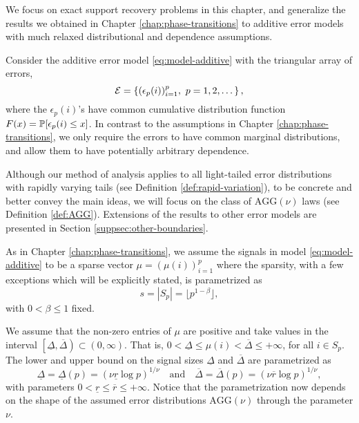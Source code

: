 
We focus on exact support recovery problems in this chapter, and generalize the results we obtained in Chapter \ref{chap:phase-transitions} to additive error models with much relaxed distributional and dependence assumptions.

Consider the additive error model \eqref{eq:model-additive} with the triangular array of errors,
\begin{equation} \label{eq:error-array}
    {\cal E} = \left\{ (\epsilon_p(i))_{i=1}^p,\ p=1,2,\dots\right\},
\end{equation}
where the $\epsilon_p(i)$'s have common cumulative distribution function $F(x)=\P[\epsilon_p(i)\le x]$.
In contrast to the assumptions in Chapter \ref{chap:phase-transitions}, we only require the errors to have common marginal distributions, and allow them to have potentially arbitrary dependence.

Although our method of analysis applies to all light-tailed error distributions with rapidly varying tails (see Definition \ref{def:rapid-variation}), to be concrete and better convey the main ideas, we will focus on the class of $\mathrm{AGG}(\nu)$ laws (see Definition \ref{def:AGG}).
Extensions of the results to other error models are presented in Section \ref{suppsec:other-boundaries}.

As in Chapter \ref{chap:phase-transitions}, we assume the signals in model \eqref{eq:model-additive} to be a sparse vector $\mu = \left(\mu(i)\right)_{i=1}^p$ where the sparsity, with a few exceptions which will be explicitly stated, is parametrized as
\begin{equation} \label{eq:sparsity-parametrized}
    s = |S_p| = \lfloor p^{1 -\beta} \rfloor, %
\end{equation}
with $0 < \beta \le 1$ fixed.

We assume that the non-zero entries of $\mu$ are positive and take values in the interval $\left[\underline{\Delta},\overline{\Delta}\right)\subset (0,\infty)$.
That is, $0<\underline{\Delta}\le\mu(i)<\overline{\Delta}\le+\infty$, for all $i\in S_p$.
The lower and upper bound on the signal sizes $\underline{\Delta}$ and $\overline{\Delta}$ are parametrized as
\begin{equation} \label{eq:signal-size-parametrized}
    \underline{\Delta} = \underline{\Delta}(p) = (\nu \underline{r} \log{p})^{1/\nu} \quad \text{and} \quad
    \overline{\Delta} = \overline{\Delta}(p)  = (\nu \overline{r} \log{p})^{1/\nu},
\end{equation}
with parameters $0 < \underline{r} \le \overline{r} \le +\infty$.
Notice that the parametrization now depends on the shape of the assumed error distributions $\mathrm{AGG}(\nu)$ through the parameter $\nu$.

